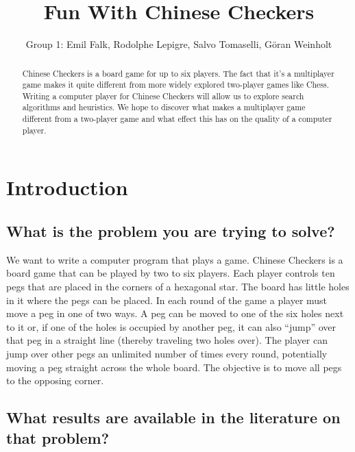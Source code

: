 \documentclass[a4paper,11pt]{report}
\begin{document}
\title{Fun With Chinese Checkers}
\author{Group 1: Emil Falk, Rodolphe Lepigre, Salvo Tomaselli, Göran Weinholt}
\maketitle
\begin{abstract}\centering

Chinese Checkers is a board game for up to six players. The fact that
it's a multiplayer game makes it quite different from more widely
explored two-player games like Chess. Writing a computer player for
Chinese Checkers will allow us to explore search algorithms and
heuristics. We hope to discover what makes a multiplayer game
different from a two-player game and what effect this has on the
quality of a computer player.

\end{abstract}

\chapter{Introduction}
\section{What is the problem you are trying to solve?}

We want to write a computer program that plays a game. Chinese
Checkers is a board game that can be played by two to six players.
Each player controls ten pegs that are placed in the corners of a
hexagonal star. The board has little holes in it where the pegs can be
placed. In each round of the game a player must move a peg in one of
two ways. A peg can be moved to one of the six holes next to it or, if
one of the holes is occupied by another peg, it can also ``jump'' over
that peg in a straight line (thereby traveling two holes over). The
player can jump over other pegs an unlimited number of times every
round, potentially moving a peg straight across the whole board. The
objective is to move all pegs to the opposing corner.

\section{What results are available in the literature on that problem?}
\end{document}
